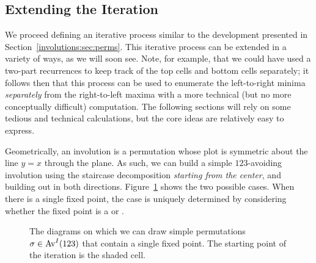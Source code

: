     

  \subsection{Extending the Iteration} 

    We proceed defining an iterative process similar to the development
    presented in Section~\ref{involutions:sec:perms}. 
    This iterative process can be extended in a variety of ways, as we will
    soon see. Note, for example, that we could have used a two-part recurrences
    to keep track of the top cells and bottom cells separately; it follows then
    that this process can be used to enumerate the left-to-right minima
    \emph{separately} from the right-to-left maxima with a more technical (but
    no more conceptually difficult) computation. The following sections will
    rely on some tedious and technical calculations, but the core ideas are
    relatively easy to express. 

    Geometrically, an involution is a permutation whose plot is symmetric about
    the line $y = x$ through the plane. As such, we can build a simple
    $123$-avoiding involution using the staircase decomposition \emph{starting
    from the center}, and building out in both directions.
    Figure~\ref{involutions:fig:staircase-center} shows the two possible cases.
    When there is a single fixed point, the case is uniquely determined by
    considering whether the fixed point is a \rtlmax{} or \ltrmin{}. 



    \begin{figure}[t]
    \centering
      \hspace{4pc}
      \caption[The diagrams on which we can draw simple permutations]{
        The diagrams on which we can draw simple permutations $\sigma
        \in \operatorname{{Av}}^I(123)$ that contain a single fixed point.  The starting point
        of the iteration is the shaded cell.}
      \label{involutions:fig:staircase-center}
    \end{figure}
  
